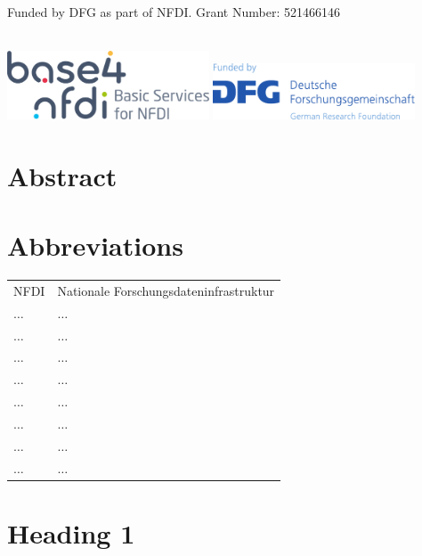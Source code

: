 \documentclass[headsepline,titlepage,twoside,12pt,toc=flat,headings=normal]{scrreprt}
\begin{document}
~\\
Funded by DFG as part of NFDI. Grant Number: 521466146

~\\
\includegraphics[width=6cm]{img/base.png}
\hfill
\includegraphics[width=6cm]{img/dfg.pdf}

\chapter*{Abstract}\label{ch:abstract}

\chapter*{Abbreviations}
\begin{tabularx}{\textwidth}{lX}
NFDI					&Nationale Forschungsdateninfrastruktur\\
$\ldots$				&$\ldots$\\
$\ldots$				&$\ldots$\\
$\ldots$				&$\ldots$\\
$\ldots$				&$\ldots$\\
$\ldots$				&$\ldots$\\
$\ldots$				&$\ldots$\\
$\ldots$				&$\ldots$\\
$\ldots$				&$\ldots$\\
\end{tabularx}

\tableofcontents

\chapter{Heading 1}\label{ch:firstchapter}
\end{document}
